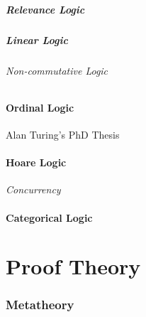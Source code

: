 \documentclass{article}
\begin{document}
\subsubsection{Relevance Logic}\label{subsec:relevance_logic}

\subsubsection{Linear Logic}\label{subsec:linear_logic}

\paragraph{Non-commutative Logic}\label{subsec:noncommutative_logic}

\subsection{Ordinal Logic}

Alan Turing's PhD Thesis \cite{turing38}

\subsection{Hoare Logic}

\emph{Concurrency}

\subsection{Categorical Logic}

\part{Proof Theory}\label{sec:proof_theory}

\section{Metatheory} \label{sec:metatheory}
\end{document}
